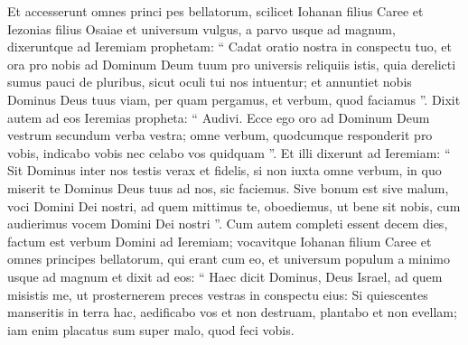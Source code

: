 \begin{biblechapter}
\begin{biblechapter}
\begin{biblechapter}
\begin{biblechapter}
\begin{biblechapter}
\begin{biblechapter}
\begin{biblechapter}
\begin{biblechapter}
\begin{biblechapter}
\begin{biblechapter}
\begin{biblechapter}
\begin{biblechapter}
\begin{biblechapter}
\begin{biblechapter}
\begin{biblechapter}
\begin{biblechapter}
\begin{biblechapter}
\begin{biblechapter}
\begin{biblechapter}
\begin{biblechapter}
\begin{biblechapter}
\begin{biblechapter}
\begin{biblechapter}
\begin{biblechapter}
\begin{biblechapter}
\begin{biblechapter}
\begin{biblechapter}
\begin{biblechapter}
\begin{biblechapter}
\begin{biblechapter}
\begin{biblechapter}
\begin{biblechapter}
\begin{biblechapter}
\begin{biblechapter}
\begin{biblechapter}
\begin{biblechapter}
\begin{biblechapter}
\begin{biblechapter}
\begin{biblechapter}
\begin{biblechapter}
\begin{biblechapter}
\begin{biblechapter}
\verse Et accesserunt omnes princi pes bellatorum, scilicet Iohanan filius Caree et Iezonias filius Osaiae et universum vulgus, a parvo usque ad magnum, 
\verse dixeruntque ad Ieremiam prophetam: “ Cadat oratio nostra in conspectu tuo, et ora pro nobis ad Dominum Deum tuum pro universis reliquiis istis, quia derelicti sumus pauci de pluribus, sicut oculi tui nos intuentur; 
\verse et annuntiet nobis Dominus Deus tuus viam, per quam pergamus, et verbum, quod faciamus ”. 
\verse Dixit autem ad eos Ieremias propheta: “ Audivi. Ecce ego oro ad Dominum Deum vestrum secundum verba vestra; omne verbum, quodcumque responderit pro vobis, indicabo vobis nec celabo vos quidquam ”. 
\verse Et illi dixerunt ad Ieremiam: “ Sit Dominus inter nos testis verax et fidelis, si non iuxta omne verbum, in quo miserit te Dominus Deus tuus ad nos, sic faciemus. 
\verse Sive bonum est sive malum, voci Domini Dei nostri, ad quem mittimus te, oboediemus, ut bene sit nobis, cum audierimus vocem Domini Dei nostri ”.
 \verse Cum autem completi essent decem dies, factum est verbum Domini ad Ieremiam; 
 \verse vocavitque Iohanan filium Caree et omnes principes bellatorum, qui erant cum eo, et universum populum a minimo usque ad magnum 
\verse et dixit ad eos: “ Haec dicit Dominus, Deus Israel, ad quem misistis me, ut prosternerem preces vestras in conspectu eius: 
\verse Si quiescentes manseritis in terra hac, aedificabo vos et non destruam, plantabo et non evellam; iam enim placatus sum super malo, quod feci vobis. 

\end{biblechapter}
\end{biblechapter}
\end{biblechapter}
\end{biblechapter}
\end{biblechapter}
\end{biblechapter}
\end{biblechapter}
\end{biblechapter}
\end{biblechapter}
\end{biblechapter}
\end{biblechapter}
\end{biblechapter}
\end{biblechapter}
\end{biblechapter}
\end{biblechapter}
\end{biblechapter}
\end{biblechapter}
\end{biblechapter}
\end{biblechapter}
\end{biblechapter}
\end{biblechapter}
\end{biblechapter}
\end{biblechapter}
\end{biblechapter}
\end{biblechapter}
\end{biblechapter}
\end{biblechapter}
\end{biblechapter}
\end{biblechapter}
\end{biblechapter}
\end{biblechapter}
\end{biblechapter}
\end{biblechapter}
\end{biblechapter}
\end{biblechapter}
\end{biblechapter}
\end{biblechapter}
\end{biblechapter}
\end{biblechapter}
\end{biblechapter}
\end{biblechapter}
\end{biblechapter}
